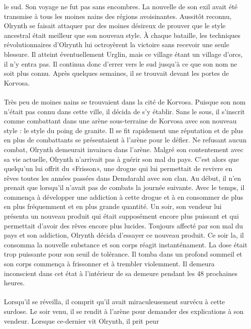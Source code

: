 \documentclass[main.tex]{subfiles}
\begin{document}
    le sud. Son voyage ne fut pas sans encombres. La nouvelle de son exil avait été transmise à tous les moines
    nains des régions avoisinantes. Aussitôt reconnu, Olrynth se faisait attaquer par des moines désireux de
    prouver que le style ancestral était meilleur que son nouveau style. À chaque bataille, les techniques
    révolutionnaires d'Olrynth lui octroyèrent la victoire sans recevoir une seule blessure. Il atteint
    éventuellement Urglin, mais ce village étant un village d'orcs, il n'y entra pas. Il continua donc d'errer
    vers le sud jusqu'à ce que son nom ne soit plus connu. Après quelques semaines, il se trouvait devant les
    portes de Korvosa.\\
    \\
    Très peu de moines nains se trouvaient dans la cité de Korvosa. Puisque son nom n'était pas connu dans cette
    ville, il décida de s'y établir. Sans le sous, il s'inscrit comme combattant dans une arène sous-terraine de
    Korvosa avec son nouveau style : le style du poing de granite. Il se fit rapidement une réputation et de
    plus en plus de combattants se présentaient à l'arène pour le défier. Ne refusant aucun combat, Olrynth
    demeurait invaincu dans l'arène. Malgré son contentement avec sa vie actuelle, Olrynth n'arrivait pas à
    guérir son mal du pays. C'est alors que quelqu'un lui offrit du «Frisson», une drogue qui lui permettait de
    revivre en rêves toutes les années passées dans Demdarahl avec son clan. Au début, il n'en prenait que
    lorsqu'il n'avait pas de combats la journée suivante. Avec le temps, il commença à développer une addiction
    à cette drogue et à en consommer de plus en plus fréquemment et en plus grande quantité. Un soir, son 
    vendeur lui présenta un nouveau produit qui était supposément encore plus puissant et qui permettait 
    d'avoir des rêves encore plus lucides. Toujours affecté par son mal du pays et son addiction, Olrynth décida
    d'essayer ce nouveau produit. Ce soir la, il consomma la nouvelle substance et son corps réagit 
    instanténament. La dose était trop puissante pour son seuil de tolérance. Il tomba dans un profond sommeil 
    et son corps commença à frissonner et à trembler violemment. Il demeura inconscient dans cet état à 
    l'intérieur de sa demeure pendant les 48 prochaines heures.\\
    \\
    Lorsqu'il se réveilla, il comprit qu'il avait miraculeusement survécu à cette surdose. Le soir venu, il se
    rendit à l'arène pour demander des explications à son vendeur. Lorsque ce-dernier vit Olrynth, il prit peur
\end{document}
